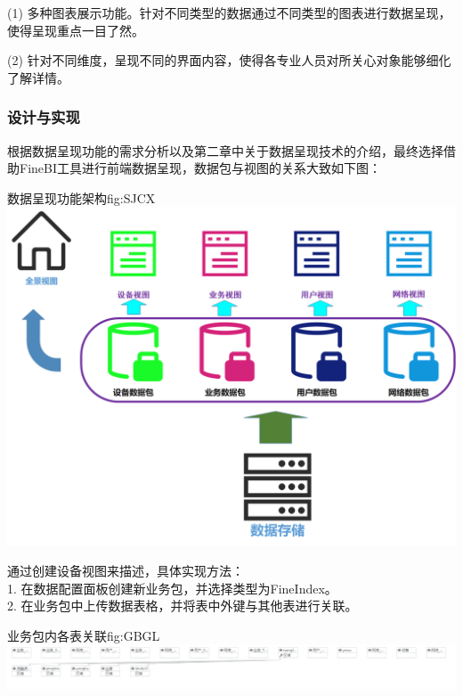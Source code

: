 \documentclass{HustGraduPaper}
\begin{document}
    (1) 多种图表展示功能。针对不同类型的数据通过不同类型的图表进行数据呈现，使得呈现重点一目了然。

    (2) 针对不同维度，呈现不同的界面内容，使得各专业人员对所关心对象能够细化了解详情。

    \subsubsection{设计与实现}
    根据数据呈现功能的需求分析以及第二章中关于数据呈现技术的介绍，最终选择借助FineBI工具进行前端数据呈现，数据包与视图的关系大致如下图：

    \begin{generalfig}{数据呈现功能架构}{fig:SJCX} 
        \includegraphics[width = \textwidth]{Figures/SJCX.png} 
    \end{generalfig}

    通过创建设备视图来描述，具体实现方法：\\
    1. 在数据配置面板创建新业务包，并选择类型为FineIndex。\\
    2. 在业务包中上传数据表格，并将表中外键与其他表进行关联。 \\

    \begin{generalfig}{业务包内各表关联}{fig:GBGL} 
        \includegraphics[width = \textwidth]{Figures/GBGL.png} 
    \end{generalfig}
\end{document}
